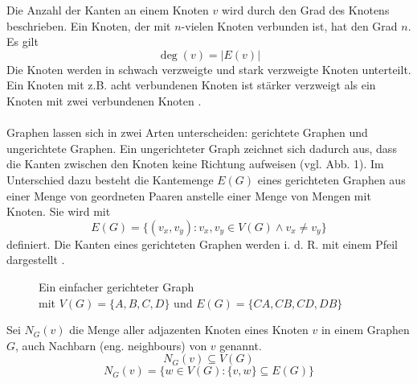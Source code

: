 Die Anzahl der Kanten an einem Knoten $v$ wird durch den Grad des Knotens beschrieben. 
Ein Knoten, der mit $n$-vielen Knoten verbunden ist, hat den Grad $n$. Es gilt
$$\deg(v) = |E(v)|$$
Die Knoten werden in schwach verzweigte und stark verzweigte Knoten unterteilt. 
Ein Knoten mit z.B. acht verbundenen Knoten ist stärker verzweigt als ein Knoten mit zwei verbundenen Knoten \parencite[5]{Diestel2017-bj}.\\\\
Graphen lassen sich in zwei Arten unterscheiden: gerichtete Graphen und ungerichtete Graphen. Ein ungerichteter Graph zeichnet sich dadurch aus, dass die Kanten zwischen den Knoten keine Richtung aufweisen (vgl. Abb. 1). Im Unterschied dazu besteht die Kantemenge $E(G)$ eines gerichteten Graphen aus einer Menge von geordneten Paaren anstelle einer Menge von Mengen mit Knoten. Sie wird mit
\begin{equation*}
    E(G) = \{(v_x, v_y) \colon v_x,v_y \in V(G) \wedge v_x \neq v_y\}
\end{equation*}
definiert. Die Kanten eines gerichteten Graphen werden i. d. R. mit einem Pfeil dargestellt \parencite[30]{Diestel2017-bj}.
\begin{figure}[H]
    \centering
    
    \caption[caption]{Ein einfacher gerichteter Graph\\ mit $V(G)=\{A,B,C,D\}$ und $E(G)=\{CA,CB,CD,DB\}$}
\end{figure}
\noindent Sei $N_G(v)$ die Menge aller adjazenten Knoten eines Knoten $v$ in einem Graphen $G$, auch Nachbarn (eng. neighbours) von $v$ genannt. \parencite[5]{Diestel2017-bj}
\begin{equation*}
    N_G(v) \subseteq V(G)
\end{equation*}
\begin{equation*}
    N_G(v)=\{w \in V(G) \colon \{v,w\} \subseteq E(G)  \}
\end{equation*}

